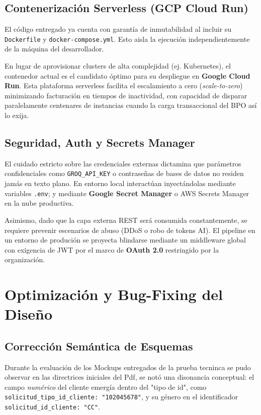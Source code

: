 \documentclass[twocolumn]{article}
\numberwithin{definition}{subsection}
\begin{document}
\subsection{Contenerización Serverless (GCP Cloud Run)}

El código entregado ya cuenta con garantía de inmutabilidad al incluir su \texttt{Dockerfile} y \texttt{docker-compose.yml}. Esto aisla la ejecución independientemente de la máquina del desarrollador.

En lugar de aprovisionar clusters de alta complejidad (ej. Kubernetes), el contenedor actual es el candidato óptimo para su despliegue en \textbf{Google Cloud Run}. Esta plataforma serverless facilita el escalamiento a cero (\textit{scale-to-zero}) minimizando facturación en tiempos de inactividad, con capacidad de disparar paralelamente centenares de instancias cuando la carga transaccional del BPO así lo exija.

\subsection{Seguridad, Auth y Secrets Manager}

El cuidado estricto sobre las credenciales externas dictamina que parámetros confidenciales como \texttt{GROQ\_API\_KEY} o contraseñas de bases de datos no residen jamás en texto plano. En entorno local interactúan inyectándolas mediante variables \texttt{.env}; y mediante \textbf{Google Secret Manager} o AWS Secrets Manager en la nube productiva.

Asimismo, dado que la capa externa REST será consumida constantemente, se requiere prevenir escenarios de abuso (DDoS o robo de tokens AI). El pipeline en un entorno de produción se proyecta blindarse mediante un middleware global con exigencia de JWT por el marco de \textbf{OAuth 2.0} restringido por la organización.

\section{Optimización y Bug-Fixing del Diseño}

\subsection{Corrección Semántica de Esquemas}

Durante la evaluación de los Mockups entregados de la prueba tecninca se pudo observar en las directrices iniciales del Pdf, se notó una disonancia conceptual: el campo \textit{numérico} del cliente emergía dentro del "tipo de id", como \texttt{solicitud\_tipo\_id\_cliente: "102045678"}, y su género en el identificador \texttt{solicitud\_id\_cliente: "CC"}. 
\end{document}

